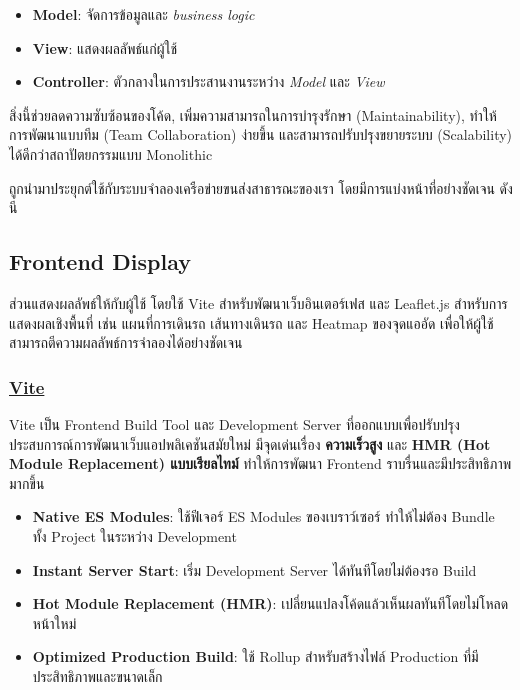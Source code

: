 \begin{itemize}
  \item \textbf{Model}: จัดการข้อมูลและ \textit{business logic}
  \item \textbf{View}: แสดงผลลัพธ์แก่ผู้ใช้
  \item \textbf{Controller}: ตัวกลางในการประสานงานระหว่าง \textit{Model} และ \textit{View}
\end{itemize}

สิ่งนี้ช่วยลดความซับซ้อนของโค้ด, เพิ่มความสามารถในการบำรุงรักษา (Maintainability), 
ทำให้การพัฒนาแบบทีม (Team Collaboration) ง่ายขึ้น และสามารถปรับปรุงขยายระบบ (Scalability) 
ได้ดีกว่าสถาปัตยกรรมแบบ Monolithic

\indent ถูกนำมาประยุกต์ใช้กับระบบจำลองเครือข่ายขนส่งสาธารณะของเรา โดยมีการแบ่งหน้าที่อย่างชัดเจน ดังนี

\subsection{Frontend Display}
\begin{mypara}
    \indent ส่วนแสดงผลลัพธ์ให้กับผู้ใช้ โดยใช้ Vite
สำหรับพัฒนาเว็บอินเตอร์เฟส และ Leaflet.js สำหรับการแสดงผลเชิงพื้นที่ 
เช่น แผนที่การเดินรถ เส้นทางเดินรถ และ Heatmap ของจุดแออัด 
เพื่อให้ผู้ใช้สามารถตีความผลลัพธ์การจำลองได้อย่างชัดเจน
\end{mypara}

\subsubsection{\textbf{\underline{Vite}}}
    \begin{mypara}
        \indent Vite เป็น Frontend Build Tool และ Development Server ที่ออกแบบเพื่อปรับปรุงประสบการณ์การพัฒนาเว็บแอปพลิเคชันสมัยใหม่ มีจุดเด่นเรื่อง \textbf{ความเร็วสูง} และ \textbf{HMR (Hot Module Replacement) แบบเรียลไทม์} ทำให้การพัฒนา Frontend ราบรื่นและมีประสิทธิภาพมากขึ้น  
    \end{mypara}

\begin{itemize}
    \item \textbf{Native ES Modules}: ใช้ฟีเจอร์ ES Modules ของเบราว์เซอร์ ทำให้ไม่ต้อง Bundle ทั้ง Project ในระหว่าง Development
    \item \textbf{Instant Server Start}: เริ่ม Development Server ได้ทันทีโดยไม่ต้องรอ Build
    \item \textbf{Hot Module Replacement (HMR)}: เปลี่ยนแปลงโค้ดแล้วเห็นผลทันทีโดยไม่โหลดหน้าใหม่
    \item \textbf{Optimized Production Build}: ใช้ Rollup สำหรับสร้างไฟล์ Production ที่มีประสิทธิภาพและขนาดเล็ก
\end{itemize}

